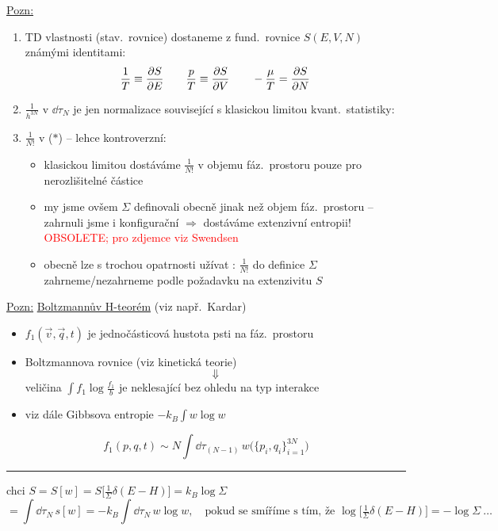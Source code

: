 \underline{Pozn:}
\begin{enumerate}[label=\arabic*)]
  \item TD vlastnosti (stav.\ rovnice) dostaneme z fund.\ rovnice $S(E,V,N)$ známými identitami:
  \[
    \frac1T \equiv \pdv{S}{E} \qquad \frac{p}{T} \equiv \pdv{S}{V} \qquad -\frac{\mu}{T} = \pdv{S}{N}
  \]
  \item $\frac{1}{h^{3N}}$ v $\dd\tau_N$ je jen normalizace související s klasickou limitou kvant.\ statistiky: \\
  \item $\frac{1}{N!}$ v ($*$) -- lehce kontroverzní:
  \begin{itemize}
    \item[$\to$] klasickou limitou dostáváme $\frac{1}{N!}$ v objemu fáz.\ prostoru pouze pro nerozlišitelné částice
    \item[$\to$] my jsme ovšem $\Sigma$ definovali obecně jinak než objem fáz.\ prostoru -- zahrnuli jsme i konfigurační  $\Rightarrow$ dostáváme extenzivní entropii!
          \\ \null\hfill \textcolor{Red}{\small OBSOLETE; pro zdjemce viz Swendsen}
    \item[$\to$] obecně lze s trochou opatrnosti užívat : $\frac{1}{N!}$ do definice $\Sigma$ zahrneme/nezahrneme podle požadavku na extenzivitu $S$
  \end{itemize}
\end{enumerate}

\underline{Pozn:} \underline{Boltzmannův H-teorém} (viz např.\ Kardar)
\begin{itemize}
  \item[$\to$] $f_1(\vec v,\vec q,t)$ je jednočásticová hustota psti na fáz.\ prostoru
  \item[$\to$] Boltzmannova rovnice (viz kinetická teorie)
  \[ \Downarrow \]
  \centering veličina $\displaystyle\int f_1\log\frac{f_1}{b}$ je neklesající bez ohledu na typ interakce \pozor{!}
\end{itemize}
\begin{itemize}
  \item viz dále Gibbsova entropie \quad $-k_B\int w\log w$
\end{itemize}
\textcolor{NavyBlue}{\[
  f_1(p,q,t) \sim N\int\dd\tau_{(N-1)}\,w\big(\{p_i,q_i\}_{i=1}^{3N}\big)
\]}
\noindent\rule{0.55\linewidth}{0.4pt}

{\color{NavyBlue}
chci \quad $S = S[w] = S\big[\tfrac1\Sigma\delta(E-H)\big] = k_B\log\Sigma$
\[
  = \int\dd\tau_N\,s[w] = -k_B\int\dd\tau_N\,w\log w, \quad\text{pokud se smíříme s tím, že } \log\big[\tfrac1\Sigma\delta(E-H)\big] = -\log\Sigma\ \dots
\]
}

